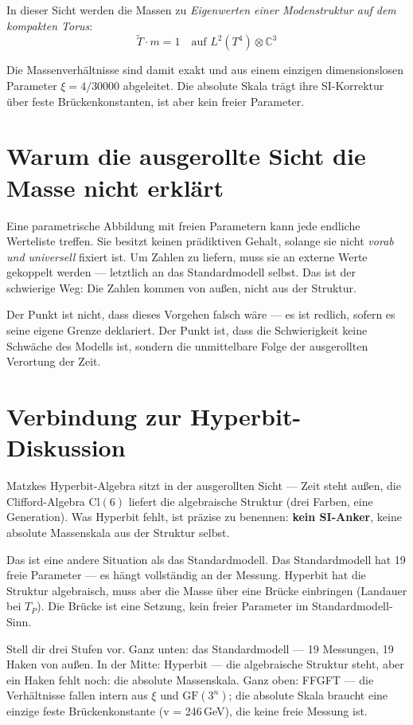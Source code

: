 In dieser Sicht werden die Massen zu \emph{Eigenwerten einer
Modenstruktur auf dem kompakten Torus}:
\[
  \tilde{T} \cdot m = 1 \quad \text{auf } L^2(T^4) \otimes \mathbb{C}^3
\]

Die Massenverhältnisse sind damit exakt und aus einem einzigen dimensionslosen
Parameter $\xi = 4/30000$ abgeleitet. Die absolute Skala trägt ihre
SI-Korrektur über feste Brückenkonstanten, ist aber kein freier Parameter.

\section{Warum die ausgerollte Sicht die Masse nicht erklärt}

Eine parametrische Abbildung mit freien Parametern kann jede endliche
Werteliste treffen. Sie besitzt keinen prädiktiven Gehalt, solange sie nicht
\emph{vorab und universell} fixiert ist. Um Zahlen zu liefern, muss sie an
externe Werte gekoppelt werden --- letztlich an das Standardmodell selbst. Das
ist der schwierige Weg: Die Zahlen kommen von außen, nicht aus der Struktur.

Der Punkt ist nicht, dass dieses Vorgehen falsch wäre --- es ist redlich,
sofern es seine eigene Grenze deklariert. Der Punkt ist, dass die Schwierigkeit
keine Schwäche des Modells ist, sondern die unmittelbare Folge der ausgerollten
Verortung der Zeit.

\section{Verbindung zur Hyperbit-Diskussion}

Matzkes Hyperbit-Algebra sitzt in der ausgerollten Sicht --- Zeit steht
außen, die Clifford-Algebra $\mathrm{Cl}(6)$ liefert die algebraische
Struktur (drei Farben, eine Generation). Was Hyperbit fehlt, ist präzise
zu benennen: \textbf{kein SI-Anker}, keine absolute Massenskala aus der
Struktur selbst. 

Das ist eine andere Situation als das Standardmodell. Das Standardmodell
hat 19 freie Parameter --- es hängt vollständig an der Messung. Hyperbit
hat die Struktur algebraisch, muss aber die Masse über eine Brücke
einbringen (Landauer bei $T_P$). Die Brücke ist eine Setzung, kein
freier Parameter im Standardmodell-Sinn.

\begin{laierspur}
Stell dir drei Stufen vor. Ganz unten: das Standardmodell --- 19 Messungen,
19 Haken von außen. In der Mitte: Hyperbit --- die algebraische Struktur
steht, aber ein Haken fehlt noch: die absolute Massenskala.
Ganz oben: FFGFT --- die Verhältnisse fallen intern aus $\xi$ und
$\mathrm{GF}(3^n)$; die absolute Skala braucht eine einzige feste
Brückenkonstante (v = 246\,GeV), die keine freie Messung ist. 
\end{laierspur}


